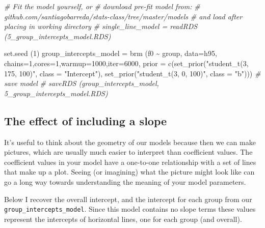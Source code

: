 \documentclass[
]{book}
\newenvironment{Shaded}{\begin{snugshade}}{\end{snugshade}}
\newcommand{\AttributeTok}[1]{\textcolor[rgb]{0.77,0.63,0.00}{#1}}
\newcommand{\CommentTok}[1]{\textcolor[rgb]{0.56,0.35,0.01}{\textit{#1}}}
\newcommand{\DecValTok}[1]{\textcolor[rgb]{0.00,0.00,0.81}{#1}}
\newcommand{\FunctionTok}[1]{\textcolor[rgb]{0.00,0.00,0.00}{#1}}
\newcommand{\NormalTok}[1]{#1}
\newcommand{\OtherTok}[1]{\textcolor[rgb]{0.56,0.35,0.01}{#1}}
\newcommand{\SpecialCharTok}[1]{\textcolor[rgb]{0.00,0.00,0.00}{#1}}
\newcommand{\StringTok}[1]{\textcolor[rgb]{0.31,0.60,0.02}{#1}}
\begin{document}
\begin{Shaded}
\begin{Highlighting}[]
\CommentTok{\# Fit the model yourself, or}
\CommentTok{\# download pre{-}fit model from: }
\CommentTok{\# github.com/santiagobarreda/stats{-}class/tree/master/models}
\CommentTok{\# and load after placing in working directory}
\CommentTok{\# single\_line\_model = readRDS (\textquotesingle{}5\_group\_intercepts\_model.RDS\textquotesingle{})}

\FunctionTok{set.seed}\NormalTok{ (}\DecValTok{1}\NormalTok{)}
\NormalTok{group\_intercepts\_model }\OtherTok{=}
  \FunctionTok{brm}\NormalTok{ (f0 }\SpecialCharTok{\textasciitilde{}}\NormalTok{ group, }\AttributeTok{data=}\NormalTok{h95, }\AttributeTok{chains=}\DecValTok{1}\NormalTok{,}\AttributeTok{cores=}\DecValTok{1}\NormalTok{,}\AttributeTok{warmup=}\DecValTok{1000}\NormalTok{,}\AttributeTok{iter=}\DecValTok{6000}\NormalTok{,}
       \AttributeTok{prior =} \FunctionTok{c}\NormalTok{(}\FunctionTok{set\_prior}\NormalTok{(}\StringTok{"student\_t(3, 175, 100)"}\NormalTok{, }\AttributeTok{class =} \StringTok{"Intercept"}\NormalTok{),}
                 \FunctionTok{set\_prior}\NormalTok{(}\StringTok{"student\_t(3, 0, 100)"}\NormalTok{, }\AttributeTok{class =} \StringTok{"b"}\NormalTok{)))}
\CommentTok{\# save model}
\CommentTok{\# saveRDS (group\_intercepts\_model, \textquotesingle{}5\_group\_intercepts\_model.RDS\textquotesingle{})}
\end{Highlighting}
\end{Shaded}

\hypertarget{the-effect-of-including-a-slope}{%
\subsection{The effect of including a slope}\label{the-effect-of-including-a-slope}}

It's useful to think about the geometry of our models because then we can make pictures, which are usually much easier to interpret than coefficient values. The coefficient values in your model have a one-to-one relationship with a set of lines that make up a plot. Seeing (or imagining) what the picture might look like can go a long way towards understanding the meaning of your model parameters.

Below I recover the overall intercept, and the intercept for each group from our \texttt{group\_intercepts\_model}. Since this model contains no slope terms these values represent the intercepts of horizontal lines, one for each group (and overall).
\end{document}
